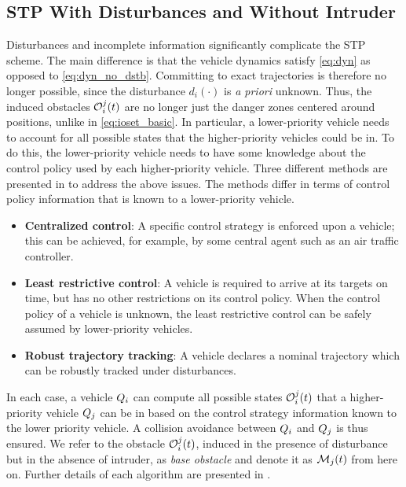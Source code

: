\subsection{STP With Disturbances and Without Intruder\label{sec:distb}}
Disturbances and incomplete information significantly complicate the STP scheme. The main difference is that the vehicle dynamics satisfy \eqref{eq:dyn} as opposed to \eqref{eq:dyn_no_dstb}. Committing to exact trajectories is therefore no longer possible, since the disturbance $d_i(\cdot)$ is \textit{a priori} unknown. Thus, the induced obstacles $\mathcal{O}_i^j(t)$ are no longer just the danger zones centered around positions, unlike in \eqref{eq:ioset_basic}. In particular, a lower-priority vehicle needs to account for all possible states that the higher-priority vehicles could be in. To do this, the lower-priority vehicle needs to have some knowledge about the control policy used by each higher-priority vehicle. Three different methods are presented in \cite{Bansal2017} to address the above issues. The methods differ in terms of control policy information that is known to a lower-priority vehicle.
\begin{itemize}
\item \textbf{Centralized control}: A specific control strategy is enforced upon a vehicle; this can be achieved, for example, by some central agent such as an air traffic controller. 
\item \textbf{Least restrictive control}: A vehicle is required to arrive at its targets on time, but has no other restrictions on its control policy. When the control policy of a vehicle is unknown, the least restrictive control can be safely assumed by lower-priority vehicles.
\item \textbf{Robust trajectory tracking}: A vehicle declares a nominal trajectory which can be robustly tracked under disturbances.
\end{itemize}
In each case, a vehicle $Q_i$ can compute all possible states $\mathcal{O}_i^j(t)$ that a higher-priority vehicle $Q_j$ can be in based on the control strategy information known to the lower priority vehicle. A collision avoidance between $Q_i$ and $Q_j$ is thus ensured. We refer to the obstacle $\mathcal{O}_i^j(t)$, induced in the presence of disturbance but in the absence of intruder, as \textit{base obstacle} and denote it as $\mathcal{M}_j(t)$ from here on. Further details of each algorithm are presented in \cite{Bansal2017}.
